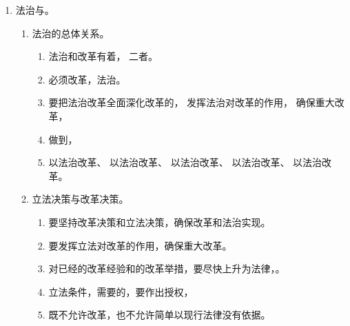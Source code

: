 \begin{enumerate}
\begin{enumerate}
\begin{enumerate}
                  \item 禁止任何个人和组织行使权力，
                  \item 坚决避免现象的发生。
                \end{enumerate}
          \item 法治与。
                \begin{enumerate}
                  \item 法治的总体关系。
                        \begin{enumerate}
                          \item 法治和改革有着，
                                二者。
                          \item 必须改革，法治。
                          \item 要把法治改革全面深化改革的，
                                发挥法治对改革的作用，
                                确保重大改革，
                          \item 做到，
                          \item 以法治改革、
                                以法治改革、
                                以法治改革、
                                以法治改革、
                                以法治改革。
                        \end{enumerate}
                  \item 立法决策与改革决策。
                        \begin{enumerate}
                          \item 要坚持改革决策和立法决策，确保改革和法治实现。
                          \item 要发挥立法对改革的作用，确保重大改革。
                          \item 对已经的改革经验和的改革举措，要尽快上升为法律，。
                          \item 立法条件，需要的，要作出授权，
                          \item 既不允许改革，也不允许简单以现行法律没有依据。

\end{enumerate}
\end{enumerate}
\end{enumerate}
\end{enumerate}
